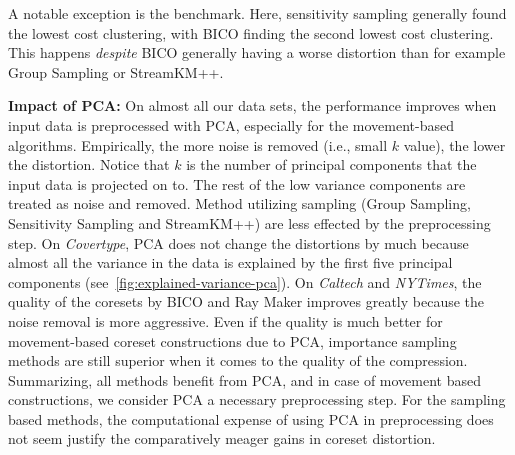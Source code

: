 A notable exception is the benchmark. Here, sensitivity sampling generally found the lowest cost clustering, with BICO finding the second lowest cost clustering. This happens \emph{despite} BICO generally having a worse distortion than for example Group Sampling or StreamKM++.





{\bf Impact of PCA:}
On almost all our data sets, the performance improves when input data is preprocessed with PCA, especially for the movement-based algorithms. Empirically, the more noise is removed (i.e., small $k$ value), the lower the distortion. Notice that $k$ is the number of principal components that the input data is projected on to. The rest of the low variance components are treated as noise and removed. Method utilizing sampling (Group Sampling, Sensitivity Sampling and StreamKM++) are less effected by the preprocessing step. On \textit{Covertype}, PCA does not change the distortions by much because almost all the variance in the data is explained by the first five principal components (see~\cref{fig:explained-variance-pca}). 
On \textit{Caltech} and \textit{NYTimes}, the quality of the coresets by BICO and Ray Maker improves greatly because the noise removal is more aggressive. Even if the quality is much better for movement-based coreset constructions due to PCA, importance sampling methods are still superior when it comes to the quality of the compression. Summarizing, all methods benefit from PCA, and in case of movement based constructions, we consider PCA a necessary preprocessing step. For the sampling based methods, the computational expense of using PCA in preprocessing does not seem justify the comparatively meager gains in coreset distortion.



